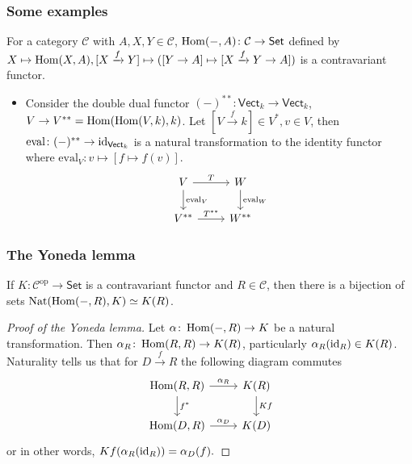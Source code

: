 \documentclass[xcolor=dvipsnames]{beamer}
\renewcommand\qedsymbol{$\boxtimes$}
\begin{document}
    \begin{frame}[fragile]
        \frametitle{Some examples} 
        \begin{example}
        For a category $\mathcal{C}$ with  $A,X,Y \in \mathcal{C} $, $\operatorname{Hom}(-,A) \colon \mathcal{C} \to \mathsf{Set} $ defined by $ X\mapsto \operatorname{Hom}(X,A), [X\xrightarrow fY] \mapsto ([Y\to A] \mapsto  [X\xrightarrow f Y \to A])$ is a contravariant functor. 
    \end{example}
    \begin{example}
        \begin{itemize}
            \item  Consider the double dual functor $(-)^{* *}\colon \mathsf{Vect} _k \to \mathsf{Vect} _k$, $V \to V^{**}=\operatorname{Hom}(\operatorname{Hom}(V,k),k) $. Let $[V \xrightarrow fk] \in V^*, v \in V$, then $\mathrm{eval} \colon (-)^{**}\to \operatorname{id}_{\mathsf{Vect}_k}$ is a natural transformation to the identity functor where $\mathrm{eval}_V \colon v\mapsto [f \mapsto f(v)]$.\[
            \begin{tikzcd}
                V \arrow[r,"T"] \arrow[d,"\mathrm{eval}_V"]& W\arrow[d,"\mathrm{eval}_W"]\\
                V^{* *}\arrow[r,"T^{**}"]  & W^{* *}
            \end{tikzcd}
            \] 
        \end{itemize}
    \end{example}
    \end{frame}

    \begin{frame}[fragile]
        \frametitle{The Yoneda lemma} 
        \begin{lemma}
            If $K \colon \mathcal{C}^{\mathrm{op}}  \to \mathsf{Set} $ is a contravariant functor and $R \in \mathcal{C} $, then there is a bijection of sets $\operatorname{Nat}(\operatorname{Hom}(-,R),K) \simeq K(R)$.
        \end{lemma}
        \begin{proof}[Proof of the Yoneda lemma]\renewcommand{\qedsymbol}{}
            Let $\alpha \colon \operatorname{Hom}(-,R) \to K$ be a natural transformation. Then $\alpha _R \colon \operatorname{Hom}(R,R) \to K(R)$, particularly $\alpha _R(\operatorname{id}_R) \in K(R)$. Naturality tells us that for $D\xrightarrow fR$ the following diagram commutes \[
           \begin{tikzcd}
{\Hom(R,R)} \arrow[r, "\alpha_R"] \arrow[d, "f^*"] & K(R) \arrow[d, "Kf"] \\
{\Hom(D,R)} \arrow[r, "\alpha_D"]                  & K(D)                  
\end{tikzcd} 
            \] or in other words, $Kf(\alpha _R(\operatorname{id}_R))=\alpha _D(f).$
        \end{proof}
    \end{frame}
\end{document}
